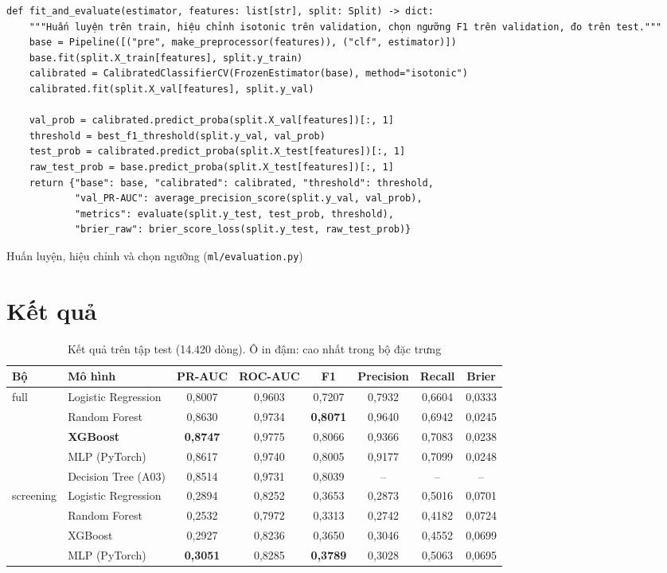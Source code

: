 \documentclass[12pt,a4paper]{report}
\begin{document}
\begin{listing}[H]
\begin{verbatim}
def fit_and_evaluate(estimator, features: list[str], split: Split) -> dict:
    """Huấn luyện trên train, hiệu chỉnh isotonic trên validation, chọn ngưỡng F1 trên validation, đo trên test."""
    base = Pipeline([("pre", make_preprocessor(features)), ("clf", estimator)])
    base.fit(split.X_train[features], split.y_train)
    calibrated = CalibratedClassifierCV(FrozenEstimator(base), method="isotonic")
    calibrated.fit(split.X_val[features], split.y_val)

    val_prob = calibrated.predict_proba(split.X_val[features])[:, 1]
    threshold = best_f1_threshold(split.y_val, val_prob)
    test_prob = calibrated.predict_proba(split.X_test[features])[:, 1]
    raw_test_prob = base.predict_proba(split.X_test[features])[:, 1]
    return {"base": base, "calibrated": calibrated, "threshold": threshold,
            "val_PR-AUC": average_precision_score(split.y_val, val_prob),
            "metrics": evaluate(split.y_test, test_prob, threshold),
            "brier_raw": brier_score_loss(split.y_test, raw_test_prob)}
\end{verbatim}
\caption{Huấn luyện, hiệu chỉnh và chọn ngưỡng (\texttt{ml/evaluation.py})}
\label{lst:fit}
\end{listing}

\section{Kết quả}
\begin{table}[H]
\centering
\caption{Kết quả trên tập test (14.420 dòng). Ô in đậm: cao nhất trong bộ đặc trưng}
\label{tab:ml}
\begin{tabular}{llcccccc}
\toprule
\textbf{Bộ} & \textbf{Mô hình} & \textbf{PR-AUC} & \textbf{ROC-AUC} & \textbf{F1} & \textbf{Precision} & \textbf{Recall} & \textbf{Brier} \\
\midrule
\multirow{5}{*}{full}
 & Logistic Regression & 0,8007 & 0,9603 & 0,7207 & 0,7932 & 0,6604 & 0,0333 \\
 & Random Forest       & 0,8630 & 0,9734 & \textbf{0,8071} & 0,9640 & 0,6942 & 0,0245 \\
 & \textbf{XGBoost}    & \textbf{0,8747} & 0,9775 & 0,8066 & 0,9366 & 0,7083 & 0,0238 \\
 & MLP (PyTorch)       & 0,8617 & 0,9740 & 0,8005 & 0,9177 & 0,7099 & 0,0248 \\
 & Decision Tree (A03) & 0,8514 & 0,9731 & 0,8039 & -- & -- & -- \\
\midrule
\multirow{4}{*}{screening}
 & Logistic Regression & 0,2894 & 0,8252 & 0,3653 & 0,2873 & 0,5016 & 0,0701 \\
 & Random Forest       & 0,2532 & 0,7972 & 0,3313 & 0,2742 & 0,4182 & 0,0724 \\
 & XGBoost             & 0,2927 & 0,8236 & 0,3650 & 0,3046 & 0,4552 & 0,0699 \\
 & MLP (PyTorch)       & \textbf{0,3051} & 0,8285 & \textbf{0,3789} & 0,3028 & 0,5063 & 0,0695 \\
\bottomrule
\end{tabular}
\end{table}
\end{document}
